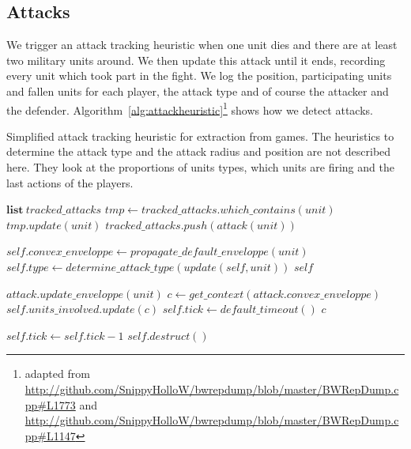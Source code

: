 \subsection{Attacks}
We trigger an attack tracking heuristic when one unit dies and there are at least two military units around. We then update this attack until it ends, recording every unit which took part in the fight. We log the position, participating units and fallen units for each player, the attack type and of course the attacker and the defender. Algorithm~\ref{alg:attackheuristic}\footnote{adapted from \url{http://github.com/SnippyHolloW/bwrepdump/blob/master/BWRepDump.cpp\#L1773} and \url{http://github.com/SnippyHolloW/bwrepdump/blob/master/BWRepDump.cpp\#L1147}} shows how we detect attacks.
\begin{algorithm}
\caption{Simplified attack tracking heuristic for extraction from games. The heuristics to determine the attack type and the attack radius and position are not described here. They look at the proportions of units types, which units are firing and the last actions of the players.}
\label{alg:attackheuristic}
\begin{algorithmic}
\State $\mathrm{\textbf{list}}\ tracked\_attacks$
    \State $tmp \leftarrow tracked\_attacks.which\_contains(unit)$
        \State $tmp.update(unit)$ 
    \Else
        \State $tracked\_attacks.push(attack(unit))$
    \EndIf
\EndFunction

 
    \State $self.convex\_enveloppe \leftarrow propagate\_default\_enveloppe(unit)$ 
    \State $ $ 
    \State $self.type \leftarrow determine\_attack\_type(update(self, unit))$
    \State \Return $self$
\EndFunction

    \State $attack.update\_enveloppe(unit)$ 
    \State $c \leftarrow get\_context(attack.convex\_enveloppe)$
    \State $self.units\_involved.update(c)$ 
    \State $self.tick \leftarrow default\_timeout()$
    \State \Return $c$
\EndFunction

    \State $self.tick \leftarrow self.tick - 1$
        \State $self.destruct()$
    \EndIf
\EndFunction
\end{algorithmic}
\end{algorithm}


